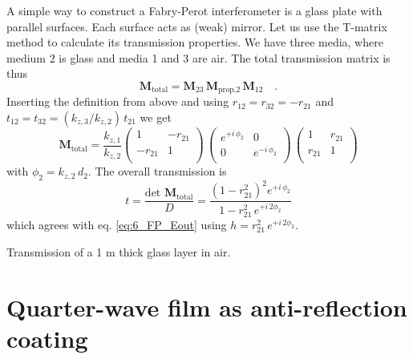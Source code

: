 A simple way to construct a Fabry-Perot interferometer is a glass plate with parallel surfaces. Each surface acts as (weak) mirror. Let us use the T-matrix method to calculate its transmission properties. We have three media, where medium 2 is glass and media 1 and 3 are air. The total transmission matrix is thus
\begin{equation}
  \mathbf{M}_\text{total}  = \mathbf{M}_{23} \, \mathbf{M}_\text{prop,2} \, \mathbf{M}_{12}   \quad . 
\end{equation}
Inserting the definition from above and using $r_{12} = r_{32} = - r_{21}$ and $t_{12} = t_{32} = (k_{z,3} / k_{z,2}) \, t_{21}$ we get
\begin{equation}
  \mathbf{M}_\text{total}
  = 
  \frac{k_{z,1}}{k_{z,2}} 
  \begin{pmatrix}
  1 & -r_{21} \\ -r_{21} & 1 \\
  \end{pmatrix} 
\, 
\begin{pmatrix}
  e^{+i \, \phi_2 } & 0 \\0 & e^{-i \, \phi_2 } \\
  \end{pmatrix}
\,
\begin{pmatrix}
1 & r_{21} \\ r_{21} & 1 \\
\end{pmatrix} 
\end{equation}
with $\phi_2 = k_{z,2} \, d_2$. The overall transmission is 
\begin{equation}
  t = \frac{\text{det } \mathbf{M}_\text{total} }{D} = 
  \frac{(1 - r_{21}^2)^2   e^{+ i \, \phi_2}} {  1 - r_{21}^2 \, e^{+i \,2 \phi_2 }}
  \end{equation}
which agrees with eq. \ref{eq:6_FP_Eout} using $h = r_{21}^2 \, e^{+i \,2 \phi_2 }$.

\begin{marginfigure}
  \caption{Transmission of a 1 \textmu m  thick glass layer in air. }
\end{marginfigure}

\section{Quarter-wave film as anti-reflection coating}

